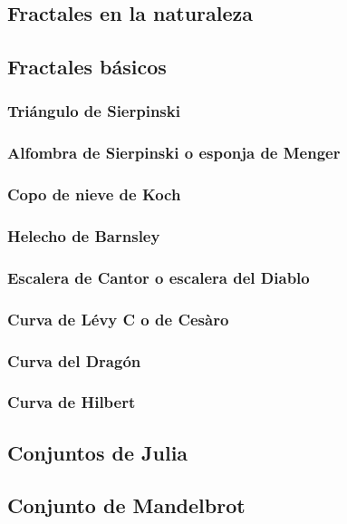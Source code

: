\documentclass[a4paper, 11pt]{article} %
\begin{document}
	\subsection{Fractales en la naturaleza}
	\subsection{Fractales básicos}
		\subsubsection{Triángulo de Sierpinski} \label{Sierpinski}
		\subsubsection{Alfombra de Sierpinski o esponja de Menger} \label{Menger}
		\subsubsection{Copo de nieve de Koch} \label{Koch}
		\subsubsection{Helecho de Barnsley} \label{Barnsley}
		\subsubsection{Escalera de Cantor o escalera del Diablo} \label{Cantor} %
		\subsubsection{Curva de Lévy C o de Cesàro} \label{Cesàro}
		\subsubsection{Curva del Dragón} \label{Dragon}
		\subsubsection{Curva de Hilbert} \label{Hilbert}
		
	\subsection{Conjuntos de Julia} \label{Julia}
	\subsection{Conjunto de Mandelbrot} \label{Mandelbrot}
\end{document}
